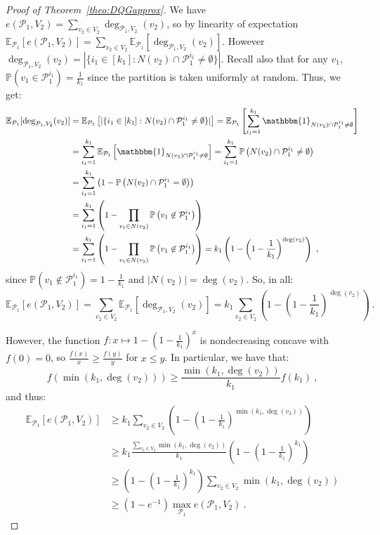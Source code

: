 \begin{proof}[Proof of Theorem~\ref{theo:DQGapprox}]
We have $e(\mathcal{P}_1,V_2)=\sum_{v_2 \in V_2}\deg_{\mathcal{P}_1,V_2}(v_2)$, so by linearity of expectation $\mathbb{E}_{\mathcal{P}_1}[e(\mathcal{P}_1,V_2)] = \sum_{v_2 \in V_2}\mathbb{E}_{\mathcal{P}_1}[\deg_{\mathcal{P}_1,V_2}(v_2)]$. However $\deg_{\mathcal{P}_1,V_2}(v_2)=|\{i_1 \in [k_1]: N(v_2) \cap \mathcal{P}_1^{i_1} \not= \emptyset  \}|$. Recall also that for any $v_1$, $\mathbb{P}\left(v_1 \in \mathcal{P}_1^{i_1}\right) = \frac{1}{k_1}$ since the partition is taken uniformly at random. Thus, we get:
\begin{equation}
  \begin{aligned}
    \mathbb{E}_{\mathcal{P}_1}[\deg_{\mathcal{P}_1,V_2}(v_2)] &= \mathbb{E}_{\mathcal{P}_1}\left[|\{i_1 \in [k_1]: N(v_2) \cap \mathcal{P}_1^{i_1} \not= \emptyset  \}|\right]
    = \mathbb{E}_{\mathcal{P}_1}\left[\sum_{i_1=1}^{k_1} \mathbbm{1}_{N(v_2) \cap \mathcal{P}_1^{i_1} \not= \emptyset}\right]\\
    &= \sum_{i_1=1}^{k_1} \mathbb{E}_{\mathcal{P}_1}\left[\mathbbm{1}_{N(v_2) \cap \mathcal{P}_1^{i_1} \not= \emptyset}\right]
    = \sum_{i_1=1}^{k_1}\mathbb{P}\left(N(v_2) \cap \mathcal{P}_1^{i_1} \not= \emptyset\right)\\
    &= \sum_{i_1=1}^{k_1}\left(1 - \mathbb{P}\left(N(v_2) \cap \mathcal{P}_1^{i_1} = \emptyset\right)\right)\\
    &= \sum_{i_1=1}^{k_1}\left(1 - \prod_{v_1 \in N(v_2)}\mathbb{P}\left(v_1 \not\in \mathcal{P}_1^{i_1}\right)\right)\\
    &= \sum_{i_1=1}^{k_1}\left(1 - \prod_{v_1 \in N(v_2)}\mathbb{P}\left(v_1 \not\in \mathcal{P}_1^{i_1}\right)\right) = k_1\left(1-\left(1-\frac{1}{k_1}\right)^{\deg(v_2)}\right) \ ,
  \end{aligned}
\end{equation}
since $\mathbb{P}\left(v_1 \not\in \mathcal{P}_1^{i_1}\right)=1-\frac{1}{k_1}$ and $|N(v_2)|=\deg(v_2)$. So, in all:
\[ \mathbb{E}_{\mathcal{P}_1}[e(\mathcal{P}_1,V_2)] = \sum_{v_2 \in V_2}\mathbb{E}_{\mathcal{P}_1}[\deg_{\mathcal{P}_1,V_2}(v_2)] = k_1\sum_{v_2 \in V_2}\left(1-\left(1-\frac{1}{k_1}\right)^{\deg(v_2)}\right) \ . \]

However, the function $f : x \mapsto 1-\left(1-\frac{1}{k_1}\right)^x$ is nondecreasing concave with $f(0)=0$, so $\frac{f(x)}{x} \geq \frac{f(y)}{y}$ for $x \leq y$. In particular, we have that:
\[ f(\min(k_1,\deg(v_2))) \geq \frac{\min(k_1,\deg(v_2))}{k_1}f(k_1) \ , \]
and thus:
\begin{equation}
  \begin{aligned}
    \mathbb{E}_{\mathcal{P}_1}[e(\mathcal{P}_1,V_2)] &\geq k_1\sum_{v_2 \in V_2}\left(1-\left(1-\frac{1}{k_1}\right)^{\min(k_1,\deg(v_2))}\right)\\
    &\geq k_1\frac{\sum_{v_2 \in V_2}\min(k_1,\deg(v_2))}{k_1}\left(1-\left(1-\frac{1}{k_1}\right)^{k_1}\right)\\
    &\geq \left(1-\left(1-\frac{1}{k_1}\right)^{k_1}\right)\sum_{v_2 \in V_2}\min\left(k_1,\deg(v_2)\right)\\
    &\geq (1-e^{-1})\max_{\mathcal{P}_1}e(\mathcal{P}_1,V_2) \ .
  \end{aligned}
\end{equation}



\end{proof}

